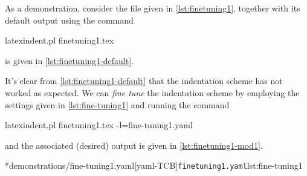  \begin{example}
	 As a demonstration, consider the file given in \cref{lst:finetuning1}, together with its
	 default output using the command
	 \begin{commandshell}
latexindent.pl finetuning1.tex 
\end{commandshell}
	 is given in \cref{lst:finetuning1-default}.

	 \begin{cmhtcbraster}[raster column skip=.01\linewidth]
	 \end{cmhtcbraster}

	 It's clear from \cref{lst:finetuning1-default} that the indentation scheme has not worked as
	 expected. We can \emph{fine tune} the indentation scheme by employing the settings
	 given in \cref{lst:fine-tuning1} and running the command
	 \begin{commandshell}
latexindent.pl finetuning1.tex -l=fine-tuning1.yaml
\end{commandshell}
	 and the associated (desired) output is given in \cref{lst:finetuning1-mod1}.

	 \begin{cmhtcbraster}[raster column skip=.01\linewidth]
		 \cmhlistingsfromfile[style=yaml-LST]*{demonstrations/fine-tuning1.yaml}[yaml-TCB]{\texttt{finetuning1.yaml}}{lst:fine-tuning1}
	 \end{cmhtcbraster}
 \end{example}

